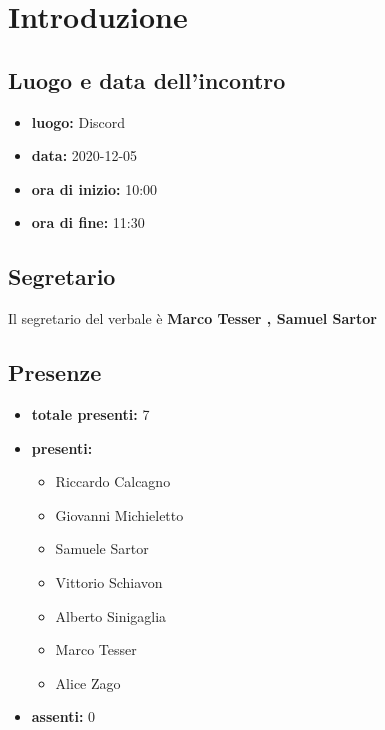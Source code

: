 \section{Introduzione}

\subsection{Luogo e data dell'incontro}
	\begin{itemize}
		\item \textbf{luogo:} Discord
		\item \textbf{data:} 2020-12-05
		\item \textbf{ora di inizio:} 10:00
		\item \textbf{ora di fine:} 11:30
	\end{itemize}

\subsection{Segretario}
Il segretario del verbale è \textbf{Marco Tesser , Samuel Sartor}

\subsection{Presenze}
	\begin{itemize}
		\item \textbf{totale presenti:} 7
		\item \textbf{presenti: }
			\begin{itemize}		
				\item Riccardo Calcagno
				\item Giovanni Michieletto
				\item Samuele Sartor
				\item Vittorio Schiavon
				\item Alberto Sinigaglia
				\item Marco Tesser
				\item Alice Zago
			\end{itemize}
		\item \textbf{assenti: } 0
	\end{itemize}


\newpage
